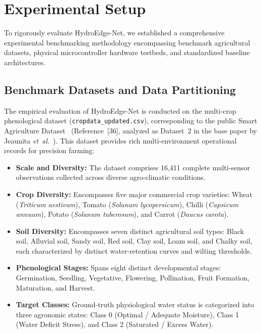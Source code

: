 \section{Experimental Setup}
\label{sec:experimental_setup}

To rigorously evaluate HydroEdge-Net, we established a comprehensive experimental benchmarking methodology encompassing benchmark agricultural datasets, physical microcontroller hardware testbeds, and standardized baseline architectures.

\subsection{Benchmark Datasets and Data Partitioning}

The empirical evaluation of HydroEdge-Net is conducted on the multi-crop phenological dataset (\texttt{cropdata\_updated.csv}), corresponding to the public Smart Agriculture Dataset~\cite{gopidesi2024smartagri} (Reference~[36], analyzed as Dataset~2 in the base paper by Jeaunita \textit{et~al.}~\cite{jeaunita2025multitask}). This dataset provides rich multi-environment operational records for precision farming:
\begin{itemize}
    \item \textbf{Scale and Diversity:} The dataset comprises 16,411 complete multi-sensor observations collected across diverse agro-climatic conditions.
    \item \textbf{Crop Diversity:} Encompasses five major commercial crop varieties: Wheat (\textit{Triticum aestivum}), Tomato (\textit{Solanum lycopersicum}), Chilli (\textit{Capsicum annuum}), Potato (\textit{Solanum tuberosum}), and Carrot (\textit{Daucus carota}).
    \item \textbf{Soil Diversity:} Encompasses seven distinct agricultural soil types: Black soil, Alluvial soil, Sandy soil, Red soil, Clay soil, Loam soil, and Chalky soil, each characterized by distinct water-retention curves and wilting thresholds.
    \item \textbf{Phenological Stages:} Spans eight distinct developmental stages: Germination, Seedling, Vegetative, Flowering, Pollination, Fruit Formation, Maturation, and Harvest.
    \item \textbf{Target Classes:} Ground-truth physiological water status is categorized into three agronomic states: Class 0 (Optimal / Adequate Moisture), Class 1 (Water Deficit Stress), and Class 2 (Saturated / Excess Water).
\end{itemize}

